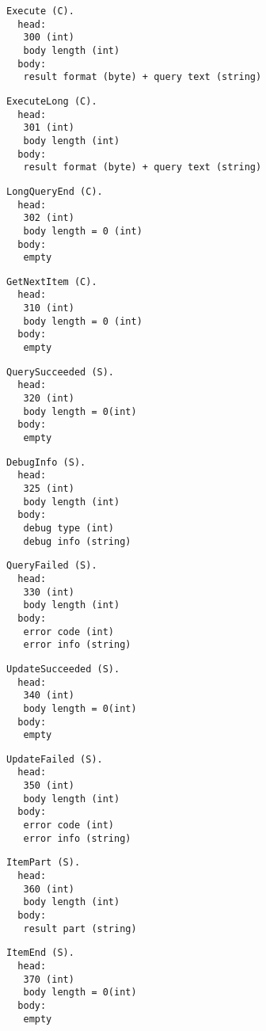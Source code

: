 \documentclass[a4paper,12pt]{article}
\begin{document}
\begin{verbatim}
Execute (C).
  head:
   300 (int)
   body length (int)
  body:
   result format (byte) + query text (string)
\end{verbatim}

\begin{verbatim}
ExecuteLong (C).
  head:
   301 (int)
   body length (int)
  body:
   result format (byte) + query text (string)
\end{verbatim}

\begin{verbatim}
LongQueryEnd (C).
  head:
   302 (int)
   body length = 0 (int)
  body:
   empty
\end{verbatim}

\begin{verbatim}
GetNextItem (C).
  head:
   310 (int)
   body length = 0 (int)
  body:
   empty
\end{verbatim}

\begin{verbatim}
QuerySucceeded (S).
  head:
   320 (int)
   body length = 0(int)
  body:
   empty
\end{verbatim}

\begin{verbatim}
DebugInfo (S).
  head:
   325 (int)
   body length (int)
  body:
   debug type (int)
   debug info (string)
\end{verbatim}

\begin{verbatim}
QueryFailed (S).
  head:
   330 (int)
   body length (int)
  body:
   error code (int)
   error info (string)
\end{verbatim}

\begin{verbatim}
UpdateSucceeded (S).
  head:
   340 (int)
   body length = 0(int)
  body:
   empty
\end{verbatim}

\begin{verbatim}
UpdateFailed (S).
  head:
   350 (int)
   body length (int)
  body:
   error code (int)
   error info (string)
\end{verbatim}

\begin{verbatim}
ItemPart (S).
  head:
   360 (int)
   body length (int)
  body:
   result part (string)
\end{verbatim}

\begin{verbatim}
ItemEnd (S).
  head:
   370 (int)
   body length = 0(int)
  body:
   empty
\end{verbatim}
\end{document}
